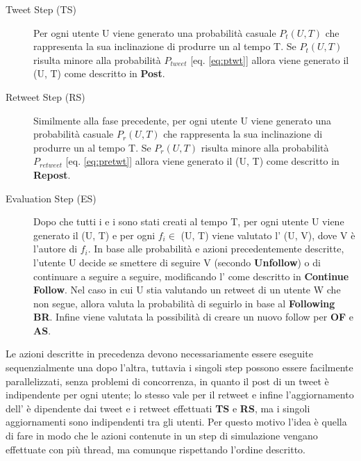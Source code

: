 \begin{description}
  \item[Tweet Step (TS)] Per ogni utente U viene generato una 
  probabilit\`a casuale $P_t(U,T)$ che rappresenta la sua 
  inclinazione di produrre un \twt{} al tempo T. Se $P_t(U,T)$
  risulta minore alla probabilit\`a $P_{tweet}$ [eq. \ref{eq:ptwt}] allora
  viene generato il \twt{}(U, T) come descritto in \textbf{Post}.
  
  \item[Retweet Step (RS)] Similmente alla fase precedente,
  per ogni utente U viene generato una 
  probabilit\`a casuale $P_r(U,T)$ che rappresenta la sua 
  inclinazione di produrre un \retwt{} al tempo T. Se $P_r(U,T)$
  risulta minore alla probabilit\`a $P_{retweet}$ [eq. \ref{eq:pretwt}] 
  allora viene generato il \retwt{}(U, T) come descritto in 
  \textbf{Repost}.
  
  \item[Evaluation Step (ES)] Dopo che tutti i \twt{} e i \retwt{}
  sono stati creati al tempo T, per ogni utente U viene generato
  il \FOV{}(U, T) e per ogni $f_i \in$ \FOV{}(U, T) viene valutato 
  l' \attach{}(U, V), dove V \`e l'autore di $f_i$. In base alle 
  probabilit\`a e azioni precedentemente descritte, l'utente U decide
  se smettere di seguire V (secondo \textbf{Unfollow}) o di
  continuare a seguire a seguire, modificando l'\attach{} come
  descritto in \textbf{Continue Follow}.
    Nel caso in cui U stia valutando un retweet di un utente W che non 
  segue, allora valuta la probabilit\`a di seguirlo in base al 
  \textbf{Following BR}.
  Infine viene valutata la possibilit\`a di creare un nuovo follow 
  per \textbf{OF} e \textbf{AS}.
\end{description}

Le azioni descritte in precedenza devono necessariamente essere 
eseguite sequenzialmente una dopo l'altra, tuttavia i singoli step 
possono essere facilmente parallelizzati, senza problemi di 
concorrenza, in quanto il post di un tweet \`e indipendente per ogni
utente; lo stesso vale per il retweet e infine l'aggiornamento dell'
\attach{} \`e  dipendente dai tweet e i retweet effettuati 
\textbf{TS} e \textbf{RS}, ma i singoli aggiornamenti sono 
indipendenti tra gli utenti. Per questo motivo l'idea \`e quella di
fare in modo che le azioni contenute in un step di simulazione 
vengano effettuate con pi\`u thread, ma comunque rispettando l'ordine
descritto.
